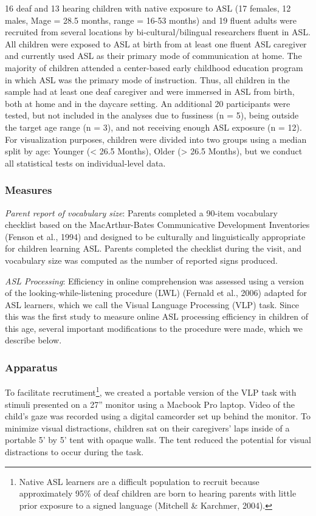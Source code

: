 \documentclass[12pt,]{article}
\let\rmarkdownfootnote\footnote%
\def\footnote{\protect\rmarkdownfootnote}
\begin{document}
16 deaf and 13 hearing children with native exposure to ASL (17 females,
12 males, Mage = 28.5 months, range = 16-53 months) and 19 fluent adults
were recruited from several locations by bi-cultural/bilingual
researchers fluent in ASL. All children were exposed to ASL at birth
from at least one fluent ASL caregiver and currently used ASL as their
primary mode of communication at home. The majority of children attended
a center-based early childhood education program in which ASL was the
primary mode of instruction. Thus, all children in the sample had at
least one deaf caregiver and were immersed in ASL from birth, both at
home and in the daycare setting. An additional 20 participants were
tested, but not included in the analyses due to fussiness (n = 5), being
outside the target age range (n = 3), and not receiving enough ASL
exposure (n = 12). For visualization purposes, children were divided
into two groups using a median split by age: Younger (\textless{} 26.5
Months), Older (\textgreater{} 26.5 Months), but we conduct all
statistical tests on individual-level data.

\subsubsection{Measures}\label{measures}

\emph{Parent report of vocabulary size}: Parents completed a 90-item
vocabulary checklist based on the MacArthur-Bates Communicative
Development Inventories (Fenson et al., 1994) and designed to be
culturally and linguistically appropriate for children learning ASL.
Parents completed the checklist during the visit, and vocabulary size
was computed as the number of reported signs produced.

\emph{ASL Processing}: Efficiency in online comprehension was assessed
using a version of the looking-while-listening procedure (LWL) (Fernald
et al., 2006) adapted for ASL learners, which we call the Visual
Language Processing (VLP) task. Since this was the first study to
measure online ASL processing efficiency in children of this age,
several important modifications to the procedure were made, which we
describe below.

\subsubsection{Apparatus}\label{apparatus}

To facilitate recrutiment\footnote{Native ASL learners are a difficult
  population to recruit because approximately 95\% of deaf children are
  born to hearing parents with little prior exposure to a signed
  language (Mitchell \& Karchmer, 2004).}, we created a portable version
of the VLP task with stimuli presented on a 27'' monitor using a Macbook
Pro laptop. Video of the child's gaze was recorded using a digital
camcorder set up behind the monitor. To minimize visual distractions,
children sat on their caregivers' laps inside of a portable 5' by 5'
tent with opaque walls. The tent reduced the potential for visual
distractions to occur during the task.
\end{document}

